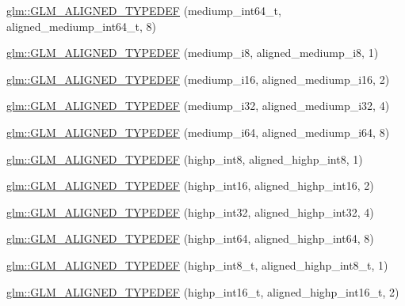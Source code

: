 \begin{DoxyCompactItemize}
\item 
\hyperlink{group__gtx__type__aligned_ga73fdc86a539808af58808b7c60a1c4d8}{glm\+::\+G\+L\+M\+\_\+\+A\+L\+I\+G\+N\+E\+D\+\_\+\+T\+Y\+P\+E\+D\+E\+F} (mediump\+\_\+int64\+\_\+t, aligned\+\_\+mediump\+\_\+int64\+\_\+t, 8)
\item 
\hyperlink{group__gtx__type__aligned_gafafeea923e1983262c972e2b83922d3b}{glm\+::\+G\+L\+M\+\_\+\+A\+L\+I\+G\+N\+E\+D\+\_\+\+T\+Y\+P\+E\+D\+E\+F} (mediump\+\_\+i8, aligned\+\_\+mediump\+\_\+i8, 1)
\item 
\hyperlink{group__gtx__type__aligned_ga4b35ca5fe8f55c9d2fe54fdb8d8896f4}{glm\+::\+G\+L\+M\+\_\+\+A\+L\+I\+G\+N\+E\+D\+\_\+\+T\+Y\+P\+E\+D\+E\+F} (mediump\+\_\+i16, aligned\+\_\+mediump\+\_\+i16, 2)
\item 
\hyperlink{group__gtx__type__aligned_ga63b882e29170d428463d99c3d630acc6}{glm\+::\+G\+L\+M\+\_\+\+A\+L\+I\+G\+N\+E\+D\+\_\+\+T\+Y\+P\+E\+D\+E\+F} (mediump\+\_\+i32, aligned\+\_\+mediump\+\_\+i32, 4)
\item 
\hyperlink{group__gtx__type__aligned_ga8b20507bb048c1edea2d441cc953e6f0}{glm\+::\+G\+L\+M\+\_\+\+A\+L\+I\+G\+N\+E\+D\+\_\+\+T\+Y\+P\+E\+D\+E\+F} (mediump\+\_\+i64, aligned\+\_\+mediump\+\_\+i64, 8)
\item 
\hyperlink{group__gtx__type__aligned_ga56c5ca60813027b603c7b61425a0479d}{glm\+::\+G\+L\+M\+\_\+\+A\+L\+I\+G\+N\+E\+D\+\_\+\+T\+Y\+P\+E\+D\+E\+F} (highp\+\_\+int8, aligned\+\_\+highp\+\_\+int8, 1)
\item 
\hyperlink{group__gtx__type__aligned_ga7a751b3aff24c0259f4a7357c2969089}{glm\+::\+G\+L\+M\+\_\+\+A\+L\+I\+G\+N\+E\+D\+\_\+\+T\+Y\+P\+E\+D\+E\+F} (highp\+\_\+int16, aligned\+\_\+highp\+\_\+int16, 2)
\item 
\hyperlink{group__gtx__type__aligned_ga70cd2144351c556469ee6119e59971fc}{glm\+::\+G\+L\+M\+\_\+\+A\+L\+I\+G\+N\+E\+D\+\_\+\+T\+Y\+P\+E\+D\+E\+F} (highp\+\_\+int32, aligned\+\_\+highp\+\_\+int32, 4)
\item 
\hyperlink{group__gtx__type__aligned_ga46bbf08dc004d8c433041e0b5018a5d3}{glm\+::\+G\+L\+M\+\_\+\+A\+L\+I\+G\+N\+E\+D\+\_\+\+T\+Y\+P\+E\+D\+E\+F} (highp\+\_\+int64, aligned\+\_\+highp\+\_\+int64, 8)
\item 
\hyperlink{group__gtx__type__aligned_gab3e10c77a20d1abad2de1c561c7a5c18}{glm\+::\+G\+L\+M\+\_\+\+A\+L\+I\+G\+N\+E\+D\+\_\+\+T\+Y\+P\+E\+D\+E\+F} (highp\+\_\+int8\+\_\+t, aligned\+\_\+highp\+\_\+int8\+\_\+t, 1)
\item 
\hyperlink{group__gtx__type__aligned_ga968f30319ebeaca9ebcd3a25a8e139fb}{glm\+::\+G\+L\+M\+\_\+\+A\+L\+I\+G\+N\+E\+D\+\_\+\+T\+Y\+P\+E\+D\+E\+F} (highp\+\_\+int16\+\_\+t, aligned\+\_\+highp\+\_\+int16\+\_\+t, 2)

\end{DoxyCompactItemize}

